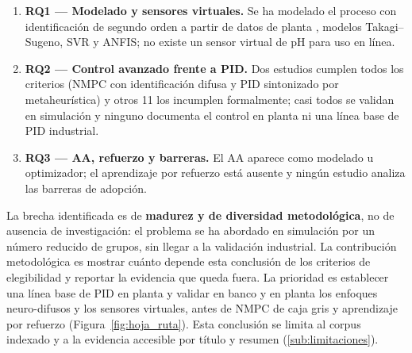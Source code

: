 \begin{enumerate}[leftmargin=*]
\item \textbf{RQ1 --- Modelado y sensores virtuales.} Se ha modelado el
proceso con identificación de segundo orden a partir de datos de planta
\parencite{murugesan2020computeraided}, modelos Takagi--Sugeno, SVR y
ANFIS; no existe un sensor virtual de pH para uso en línea.
\item \textbf{RQ2 --- Control avanzado frente a PID.} Dos estudios
cumplen todos los criterios (NMPC con identificación difusa y PID
sintonizado por metaheurística) y otros 11 los incumplen formalmente; casi
todos se validan en simulación y ninguno documenta el control en planta
ni una línea base de PID industrial.
\item \textbf{RQ3 --- AA, refuerzo y barreras.} El AA aparece como
modelado u optimizador; el aprendizaje por refuerzo está ausente y
ningún estudio analiza las barreras de adopción.
\end{enumerate}

La brecha identificada es de \textbf{madurez y de diversidad
metodológica}, no de ausencia de investigación: el problema se ha
abordado en simulación por un número reducido de grupos, sin llegar a la
validación industrial. La contribución metodológica es mostrar cuánto
depende esta conclusión de los criterios de elegibilidad y reportar la
evidencia que queda fuera. La prioridad es establecer una línea base de
PID en planta y validar en banco y en planta los enfoques neuro-difusos
y los sensores virtuales, antes de NMPC de caja gris y aprendizaje por
refuerzo (Figura~\ref{fig:hoja_ruta}). Esta conclusión se limita al
corpus indexado y a la evidencia accesible por título y resumen
(\ref{sub:limitaciones}).
